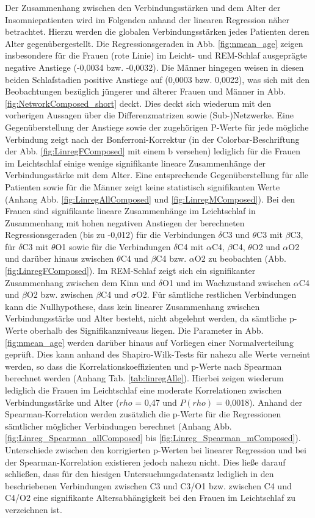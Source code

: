 Der Zusammenhang zwischen den Verbindungsstärken und dem Alter der Insomniepatienten wird im Folgenden anhand der linearen Regression näher betrachtet. Hierzu werden die globalen Verbindungsstärken jedes Patienten deren Alter gegenübergestellt. Die Regressionsgeraden in Abb. \ref{fig:nmean_age} zeigen insbesondere für die Frauen (rote Linie) im Leicht- und \acs{REM}-Schlaf ausgeprägte negative Anstiege (-0,0034 bzw. -0,0032). Die Männer hingegen weisen in diesen beiden Schlafstadien positive Anstiege auf (0,0003 bzw. 0,0022), was sich mit den Beobachtungen bezüglich jüngerer und älterer Frauen und Männer in Abb. \ref{fig:NetworkComposed_short} deckt. Dies deckt sich wiederum mit den vorherigen Aussagen über die Differenzmatrizen sowie (Sub-)Netzwerke. Eine Gegenüberstellung der Anstiege sowie der zugehörigen P-Werte für jede mögliche Verbindung zeigt nach der Bonferroni-Korrektur (in der Colorbar-Beschriftung der Abb. \ref{fig:LinregFComposed} mit einem b versehen) lediglich für die Frauen im Leichtschlaf einige wenige signifikante lineare Zusammenhänge der Verbindungsstärke mit dem Alter. Eine entsprechende Gegenüberstellung für alle Patienten sowie für die Männer zeigt keine statistisch signifikanten Werte (Anhang Abb. \ref{fig:LinregAllComposed} und \ref{fig:LinregMComposed}). Bei den Frauen sind signifikante lineare Zusammenhänge im Leichtschlaf in Zusammenhang mit hohen negativen Anstiegen der berechneten Regressionsgeraden (bis zu -0,012) für die Verbindungen $\delta$C3 und $\theta$C3 mit $\beta$C3, für $\delta$C3 mit $\theta$O1 sowie für die Verbindungen $\delta$C4 mit $\alpha$C4, $\beta$C4, $\theta$O2 und $\alpha$O2 und darüber hinaus zwischen $\theta$C4 und $\beta$C4 bzw. $\alpha$O2 zu beobachten (Abb. \ref{fig:LinregFComposed}). Im \acs{REM}-Schlaf zeigt sich ein signifikanter Zusammenhang zwischen dem Kinn und $\delta$O1 und im Wachzustand zwischen $\alpha$C4 und $\beta$O2 bzw. zwischen $\beta$C4 und $\sigma$O2. Für sämtliche restlichen Verbindungen kann die Nullhypothese, dass kein linearer Zusammenhang zwischen Verbindungsstärke und Alter besteht, nicht abgelehnt werden, da sämtliche p-Werte oberhalb des Signifikanzniveaus liegen. Die Parameter in Abb. \ref{fig:nmean_age} werden darüber hinaus auf Vorliegen einer Normalverteilung geprüft. Dies kann anhand des Shapiro-Wilk-Tests für nahezu alle Werte verneint werden, so dass die Korrelationskoeffizienten und p-Werte nach Spearman berechnet werden (Anhang Tab. \ref{tab:linregAlle}). Hierbei zeigen wiederum lediglich die Frauen im Leichtschlaf eine moderate Korrelationen zwischen Verbindungsstärke und Alter ($rho$ = 0,47 und $P(rho)$ = 0,0018). Anhand der Spearman-Korrelation  werden zusätzlich die p-Werte für die Regressionen sämtlicher möglicher Verbindungen berechnet (Anhang Abb. \ref{fig:Linreg_Spearman_allComposed} bis \ref{fig:Linreg_Spearman_mComposed}). Unterschiede zwischen den korrigierten p-Werten bei linearer Regression und bei der Spearman-Korrelation existieren jedoch nahezu nicht. Dies ließe darauf schließen, dass für den hiesigen Untersuchungsdatensatz lediglich in den beschriebenen Verbindungen zwischen C3 und C3/O1 bzw. zwischen C4 und C4/O2 eine signifikante Altersabhängigkeit bei den Frauen im Leichtschlaf zu verzeichnen ist.

